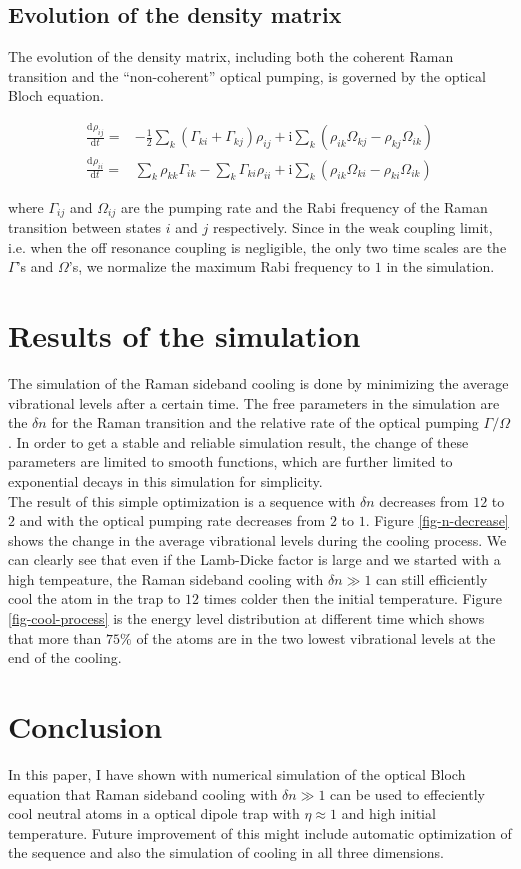 \documentclass[aps,twocolumn,secnumarabic,balancelastpage,amsmath,amssymb,nofootinbib]{revtex4}
\newcommand{\ud}{\mathrm{d}}
\newcommand{\ui}{\mathrm{i}}
\newcommand{\eqar}[1]
{
  \begin{align*}
    #1
  \end{align*}
}
\newcommand{\paren}[1]{{\left({#1}\right)}}
\newcommand{\diff}[3][{}]{{\frac{\ud^{#1} {#2}}{\ud {#3}{}^{#1}}}}
\begin{document}
\subsection{Evolution of the density matrix}
The evolution of the density matrix, including both the coherent Raman transition and the ``non-coherent'' optical pumping, is governed by the optical Bloch equation.
\eqar{
  \diff{\rho_{ij}}{t}=&-\frac12\sum_k\paren{\Gamma_{ki}+\Gamma_{kj}}\rho_{ij}+\ui\sum_k\paren{\rho_{ik}\Omega_{kj}-\rho_{kj}\Omega_{ik}}\\
  \diff{\rho_{ii}}{t}=&\sum_k\rho_{kk}\Gamma_{ik}-\sum_k\Gamma_{ki}\rho_{ii}+\ui\sum_k\paren{\rho_{ik}\Omega_{ki}-\rho_{ki}\Omega_{ik}}
}
where $\Gamma_{ij}$ and $\Omega_{ij}$ are the pumping rate and the Rabi frequency of the Raman transition between states $i$ and $j$ respectively. Since in the weak coupling limit, i.e. when the off resonance coupling is negligible, the only two time scales are the $\Gamma$'s and $\Omega$'s, we normalize the maximum Rabi frequency to $1$ in the simulation.

\section{Results of the simulation}
The simulation of the Raman sideband cooling is done by minimizing the average vibrational levels after a certain time. The free parameters in the simulation are the $\delta n$ for the Raman transition and the relative rate of the optical pumping $\Gamma/\Omega$. In order to get a stable and reliable simulation result, the change of these parameters are limited to smooth functions, which are further limited to exponential decays in this simulation for simplicity.\\

The result of this simple optimization is a sequence with $\delta n$ decreases from $12$ to $2$ and with the optical pumping rate decreases from $2$ to $1$. Figure \ref{fig-n-decrease} shows the change in the average vibrational levels during the cooling process. We can clearly see that even if the Lamb-Dicke factor is large and we started with a high tempeature, the Raman sideband cooling with $\delta n\gg1$ can still efficiently cool the atom in the trap to $12$ times colder then the initial temperature. Figure \ref{fig-cool-process} is the energy level distribution at different time which shows that more than $75\%$ of the atoms are in the two lowest vibrational levels at the end of the cooling.

\section{Conclusion}
In this paper, I have shown with numerical simulation of the optical Bloch equation that Raman sideband cooling with $\delta n\gg1$ can be used to effeciently cool neutral atoms in a optical dipole trap with $\eta\approx1$ and high initial temperature. Future improvement of this might include automatic optimization of the sequence and also the simulation of cooling in all three dimensions.


\end{document}

